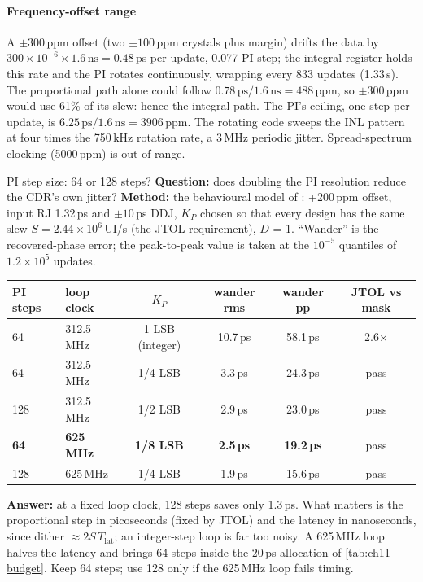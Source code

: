 \paragraph{Frequency-offset range} A $\pm300$\,ppm offset (two $\pm100$\,ppm crystals plus margin) drifts the data by $300\times10^{-6}\times1.6\,\mathrm{ns} = 0.48$\,ps per update, 0.077 PI step; the integral register holds this rate and the PI rotates continuously, wrapping every 833 updates (1.33\,\textmu{}s). The proportional path alone could follow $0.78\,\mathrm{ps}/1.6\,\mathrm{ns} = 488$\,ppm, so $\pm300$\,ppm would use 61\% of its slew: hence the integral path. The PI's ceiling, one step per update, is $6.25\,\mathrm{ps}/1.6\,\mathrm{ns} = 3906$\,ppm. The rotating code sweeps the INL pattern at four times the 750\,kHz rotation rate, a 3\,MHz periodic jitter. Spread-spectrum clocking (5000\,ppm) is out of range.

\begin{example}{PI step size: 64 or 128 steps?}\label{we:ch13-step}
\textbf{Question:} does doubling the PI resolution reduce the CDR's own jitter? \textbf{Method:} the behavioural model of : +200\,ppm offset, input RJ 1.32\,ps and $\pm10$\,ps DDJ, $K_P$ chosen so that every design has the same slew $S = 2.44\times10^6$\,UI/s (the JTOL requirement), $D$ = 1. ``Wander'' is the recovered-phase error; the peak-to-peak value is taken at the $10^{-5}$ quantiles of $1.2\times10^5$ updates.
\begin{center}\small
\begin{tabular}{llcccc}
\toprule
PI steps & loop clock & $K_P$ & wander rms & wander pp & JTOL vs mask \\
\midrule
64 & 312.5\,MHz & 1 LSB (integer) & 10.7\,ps & 58.1\,ps & 2.6$\times$ \\
64 & 312.5\,MHz & 1/4 LSB & 3.3\,ps & 24.3\,ps & pass \\
128 & 312.5\,MHz & 1/2 LSB & 2.9\,ps & 23.0\,ps & pass \\
\textbf{64} & \textbf{625\,MHz} & \textbf{1/8 LSB} & \textbf{2.5\,ps} & \textbf{19.2\,ps} & pass \\
128 & 625\,MHz & 1/4 LSB & 1.9\,ps & 15.6\,ps & pass \\
\bottomrule
\end{tabular}
\end{center}
\textbf{Answer:} at a fixed loop clock, 128 steps saves only 1.3\,ps. What matters is the proportional step in picoseconds (fixed by JTOL) and the latency in nanoseconds, since dither $\approx 2S\,T_\mathrm{lat}$; an integer-step loop is far too noisy. A 625\,MHz loop halves the latency and brings 64 steps inside the 20\,ps allocation of \cref{tab:ch11-budget}. Keep 64 steps; use 128 only if the 625\,MHz loop fails timing.
\end{example}


